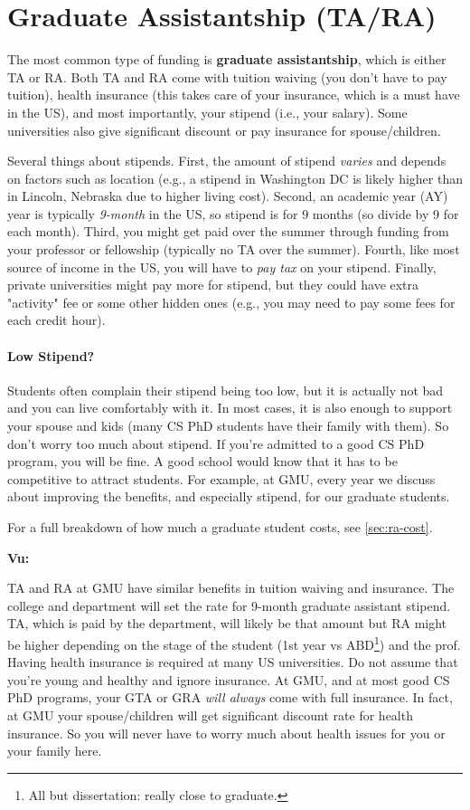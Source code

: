 \documentclass[oneside,11pt]{memoir}
\newenvironment{commentbox}[1][]{
  \small
  \begin{mybox}
    {\small \textbf{#1}}
  }{
  \end{mybox}
}
\begin{document}
\section{Graduate Assistantship (TA/RA)}
The most common type of funding is \textbf{graduate assistantship}, which is either TA or RA. Both TA and RA come with tuition waiving (you don't have to pay tuition), health insurance (this takes care of your insurance, which is a must have in the US), and most importantly, your stipend (i.e., your salary). Some universities also give significant discount or pay insurance for spouse/children.

Several things about stipends.  First, the amount of stipend \emph{varies} and depends on factors such as location (e.g., a stipend in Washington DC is likely higher than in Lincoln, Nebraska due to higher living cost). Second, an academic year (AY)  year is typically \emph{9-month} in the US, so stipend is for 9 months (so divide by 9 for each month). Third, you might get paid over the summer through funding from your professor or fellowship (typically no TA over the summer). Fourth, like most source of income in the US, you will have to \emph{pay tax} on your stipend.  Finally, private universities might pay more for stipend, but they could have extra "activity" fee or some other hidden ones (e.g., you may need to pay some fees for each credit hour).

\paragraph{Low Stipend?} Students often complain their stipend being too low, but it is actually not bad and you can live comfortably with it.  In most cases, it is also enough to support your spouse and kids (many CS PhD students have their family with them). So don't worry too much about stipend.  If you're admitted to a good CS PhD program, you will be fine. A good school would know that it has to be competitive to attract students.  For example, at GMU, every year we discuss about improving the benefits, and especially stipend, for our graduate students. 

For a full breakdown of how much a graduate student costs, see \autoref{sec:ra-cost}.

\begin{commentbox}[Vu:]
  TA and RA at GMU have similar benefits in tuition waiving and insurance.  The college and department will set the rate for 9-month graduate assistant stipend.  TA, which is paid by the department, will likely be that amount but RA might be higher depending on the stage of the student (1st year vs ABD\footnote{All but dissertation: really close to graduate.}) and the prof.
  \tcblower
  Having health insurance is required at many US universities.  Do not assume that you're young and healthy and ignore insurance.  At GMU, and at most good CS PhD programs, your GTA or GRA \emph{will always} come with full insurance. In fact, at GMU your spouse/children will get significant discount rate for health insurance.  So you will never have to worry much about health issues for you or your family here.
\end{commentbox}
\end{document}
